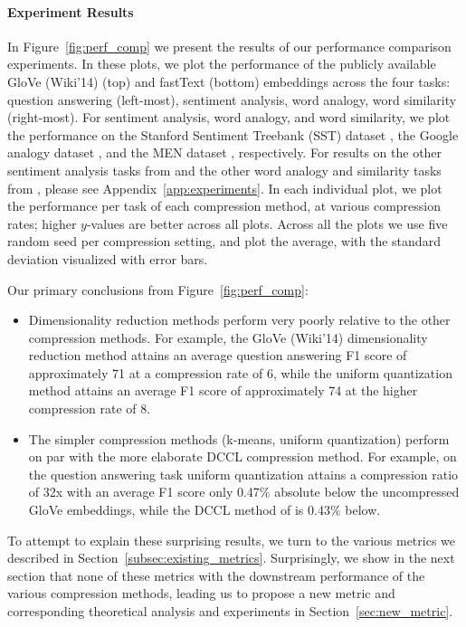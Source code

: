 \paragraph{Experiment Results}
In Figure~\ref{fig:perf_comp} we present the results of our performance comparison experiments.
In these plots, we plot the performance of the publicly available GloVe (Wiki'14) (top) and fastText (bottom) embeddings across the four tasks: question answering (left-most), sentiment analysis, word analogy, word similarity (right-most).
For sentiment analysis, word analogy, and word similarity, we plot the performance on the Stanford Sentiment Treebank (SST) dataset \citep{socher13}, the Google analogy dataset \citep{mikolov13}, and the MEN dataset \citep{bruni12}, respectively.
For results on the other sentiment analysis tasks from \citet{kim14} and the other word analogy and similarity tasks from \citet{levy15}, please see Appendix~\ref{app:experiments}.
In each individual plot, we plot the performance per task of each compression method, at various compression rates; higher $y$-values are better across all plots.
Across all the plots we use five random seed per compression setting, and plot the average, with the standard deviation visualized with error bars.

Our primary conclusions from Figure~\ref{fig:perf_comp}:
\begin{itemize}
\item Dimensionality reduction methods perform very poorly relative to the other compression methods.
For example, the GloVe (Wiki'14) dimensionality reduction method attains an average question answering F1 score of approximately 71 at a compression rate of 6, while the uniform quantization method attains an average F1 score of approximately 74 at the higher compression rate of 8.
\item The simpler compression methods (k-means, uniform quantization) perform on par with the more elaborate DCCL compression method.
For example, on the question answering task uniform quantization attains a compression ratio of 32x with an average F1 score only 0.47\% absolute below the uncompressed GloVe embeddings, while the DCCL method of \citet{dccl17} is 0.43\% below.
\end{itemize}
To attempt to explain these surprising results, we turn to the various metrics we described in Section~\ref{subsec:existing_metrics}.
Surprisingly, we show in the next section that none of these metrics  with the downstream performance of the various compression methods, leading us to propose a new metric and corresponding theoretical analysis and experiments in Section~\ref{sec:new_metric}.

